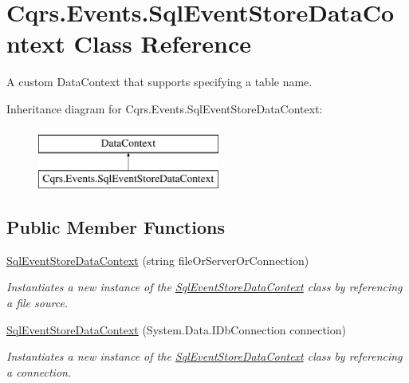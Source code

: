 \hypertarget{classCqrs_1_1Events_1_1SqlEventStoreDataContext}{}\section{Cqrs.\+Events.\+Sql\+Event\+Store\+Data\+Context Class Reference}
\label{classCqrs_1_1Events_1_1SqlEventStoreDataContext}


A custom Data\+Context that supports specifying a table name.  


Inheritance diagram for Cqrs.\+Events.\+Sql\+Event\+Store\+Data\+Context\+:\begin{figure}[H]
\begin{center}
\leavevmode
\includegraphics[height=2.000000cm]{classCqrs_1_1Events_1_1SqlEventStoreDataContext}
\end{center}
\end{figure}
\subsection*{Public Member Functions}
\begin{DoxyCompactItemize}
\item 
\hyperlink{classCqrs_1_1Events_1_1SqlEventStoreDataContext_a2b12344967911de04dbbb9c24150cfe6_a2b12344967911de04dbbb9c24150cfe6}{Sql\+Event\+Store\+Data\+Context} (string file\+Or\+Server\+Or\+Connection)
\begin{DoxyCompactList}\small\item\em Instantiates a new instance of the \hyperlink{classCqrs_1_1Events_1_1SqlEventStoreDataContext}{Sql\+Event\+Store\+Data\+Context} class by referencing a file source. \end{DoxyCompactList}\item 
\hyperlink{classCqrs_1_1Events_1_1SqlEventStoreDataContext_aaa1706a1cff7c264688b6755ab842dad_aaa1706a1cff7c264688b6755ab842dad}{Sql\+Event\+Store\+Data\+Context} (System.\+Data.\+I\+Db\+Connection connection)
\begin{DoxyCompactList}\small\item\em Instantiates a new instance of the \hyperlink{classCqrs_1_1Events_1_1SqlEventStoreDataContext}{Sql\+Event\+Store\+Data\+Context} class by referencing a connection. \end{DoxyCompactList}\end{DoxyCompactItemize}
